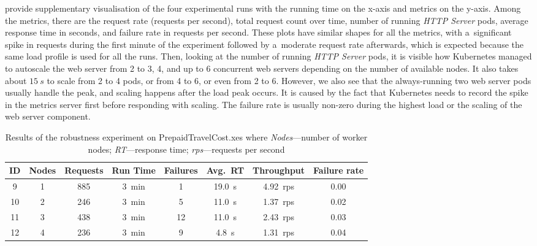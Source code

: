 \documentclass[12pt]{article}
\begin{document}
 provide supplementary visualisation of the four experimental runs with the running time on the x-axis and metrics on the y-axis. Among the metrics, there are the request rate (requests per second), total request count over time, number of running \emph{HTTP Server} pods, average response time in seconds, and failure rate in requests per second. These plots have similar shapes for all the metrics, with a~significant spike in requests during the first minute of the experiment followed by a~moderate request rate afterwards, which is expected because the same load profile is used for all the runs. Then, looking at the number of running \emph{HTTP Server} pods, it is visible how Kubernetes managed to autoscale the web server from 2 to 3, 4, and up to 6 concurrent web servers depending on the number of available nodes. It also takes about $15~s$ to scale from 2 to 4 pods, or from 4 to 6, or even from 2 to 6. However, we also see that the always-running two web server pods usually handle the peak, and scaling happens after the load peak occurs. It is caused by the fact that Kubernetes needs to record the spike in the metrics server first before responding with scaling. The failure rate is usually non-zero during the highest load or the scaling of the web server component.
\begin{table}
    \scriptsize
    \centering
    \begin{tabular}{|c|c|c|c|c|c|c|c|}
        \hline
        \textbf{ID} & \textbf{Nodes} & \textbf{Requests} & \textbf{Run Time} & \textbf{Failures} & \textbf{Avg.~RT} & \textbf{Throughput} & \textbf{Failure rate}  \\
        \hline
        \hline
        9 & 1 & 885 & 3~min & 1 & 19.0~s & 4.92~rps & 0.00 \\
        \hline
        10 & 2 & 246 & 3~min & 5 & 11.0~s & 1.37~rps & 0.02 \\
        \hline
        11 & 3 & 438 & 3~min & 12 & 11.0~s & 2.43~rps & 0.03 \\
        \hline
        12 & 4 & 236 & 3~min & 9 & 4.8~s & 1.31~rps & 0.04 \\
        \hline
    \end{tabular}
    \caption{Results of the robustness experiment on PrepaidTravelCost.xes where \emph{Nodes}---number of worker nodes; \emph{RT}---response time; \emph{rps}---requests per second}
    \label{tab:robustness_results}
\end{table}
\end{document}

